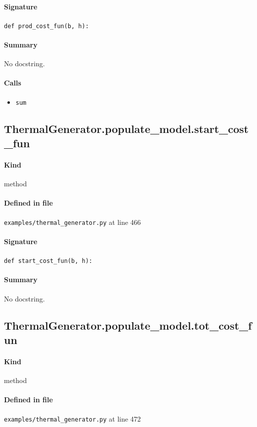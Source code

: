 \documentclass[11pt]{report}
\begin{document}
\paragraph{Signature} \texttt{def prod\_cost\_fun(b, h):}
\paragraph{Summary} No docstring.
\paragraph{Calls}
\begin{itemize}[leftmargin=*]
  \item \texttt{sum}
\end{itemize}
\subsection{ThermalGenerator.populate\_model.start\_cost\_fun}
\label{def:examples-thermal_generator.py:ThermalGenerator.populate_model.start_cost_fun:L466}
\paragraph{Kind} method
\paragraph{Defined in file} \texttt{examples/thermal\_generator.py} at line 466
\paragraph{Signature} \texttt{def start\_cost\_fun(b, h):}
\paragraph{Summary} No docstring.
\subsection{ThermalGenerator.populate\_model.tot\_cost\_fun}
\label{def:examples-thermal_generator.py:ThermalGenerator.populate_model.tot_cost_fun:L472}
\paragraph{Kind} method
\paragraph{Defined in file} \texttt{examples/thermal\_generator.py} at line 472
\end{document}

